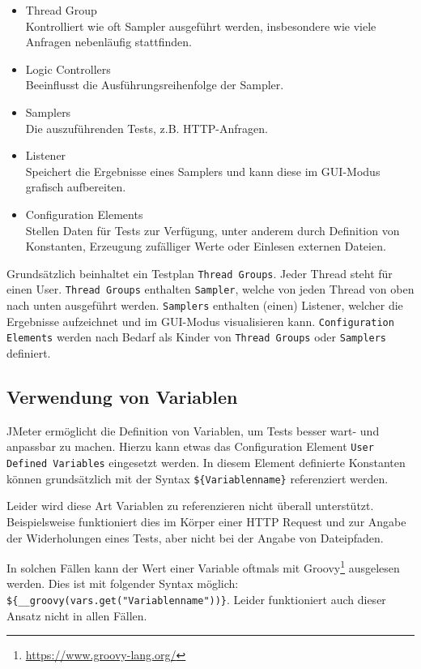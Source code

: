 \begin{itemize}
    \item Thread Group\hfill
          \\Kontrolliert wie oft Sampler ausgeführt werden, insbesondere wie viele Anfragen nebenläufig stattfinden.
    \item Logic Controllers\hfill
          \\Beeinflusst die Ausführungsreihenfolge der Sampler.
    \item Samplers\hfill
          \\Die auszuführenden Tests, z.B. HTTP-Anfragen.
    \item Listener\hfill
          \\Speichert die Ergebnisse eines Samplers und kann diese im GUI-Modus grafisch aufbereiten.
    \item Configuration Elements\hfill
          \\Stellen Daten für Tests zur Verfügung, unter anderem durch Definition von Konstanten, Erzeugung zufälliger Werte oder Einlesen externen Dateien.
\end{itemize}

Grundsätzlich beinhaltet ein Testplan \texttt{Thread Groups}.
Jeder Thread steht für einen User.
\texttt{Thread Groups} enthalten \texttt{Sampler}, welche von jeden Thread von oben nach unten ausgeführt werden.
\texttt{Samplers} enthalten (einen) Listener, welcher die Ergebnisse aufzeichnet und im GUI-Modus visualisieren kann.
\texttt{Configuration Elements} werden nach Bedarf als Kinder von \texttt{Thread Groups} oder \texttt{Samplers} definiert.


\subsection{Verwendung von Variablen}

JMeter ermöglicht die Definition von Variablen, um Tests besser wart- und anpassbar zu machen.
Hierzu kann etwas das Configuration Element \texttt{User Defined Variables} eingesetzt werden.
In diesem Element definierte Konstanten können grundsätzlich mit der Syntax \texttt{\$\{Variablenname\}} referenziert werden.

Leider wird diese Art Variablen zu referenzieren nicht überall unterstützt.
Beispielsweise funktioniert dies im Körper einer HTTP Request und zur Angabe der Widerholungen eines Tests,
aber nicht bei der Angabe von Dateipfaden.

In solchen Fällen kann der Wert einer Variable oftmals mit Groovy\footnote{\url{https://www.groovy-lang.org/}} ausgelesen werden.
Dies ist mit folgender Syntax möglich: \texttt{\$\{\_\_groovy(vars.get("Variablenname"))\}}.
Leider funktioniert auch dieser Ansatz nicht in allen Fällen.


